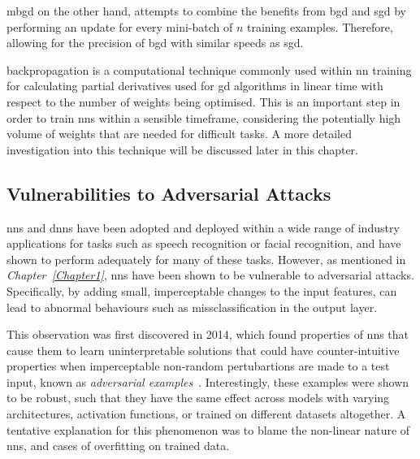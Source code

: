 \gls{mbgd} on the other hand, attempts to combine the benefits from \gls{bgd} and \gls{sgd} by 
performing an update for every mini-batch of $n$ training examples. Therefore, allowing for the precision of
\gls{bgd} with similar speeds as \gls{sgd}.

backpropagation is a computational technique commonly used within \gls{nn} training for calculating
partial derivatives used for \gls{gd} algorithms in linear time with respect 
to the number of weights being optimised. This is an important
step in order to train \glspl{nn} within a sensible timeframe, considering the potentially
high volume of weights that are needed for difficult tasks. A more detailed 
investigation into this technique will be discussed later in this chapter.

\subsection{Vulnerabilities to Adversarial Attacks}

\glspl{nn} and \glspl{dnn} have been adopted and deployed within a wide
range of industry applications for tasks such as speech recognition or facial recognition, 
and have shown to perform adequately for many of these tasks. However, as mentioned in \textit{Chapter~\ref{Chapter1}}, \glspl{nn} have been shown to be
vulnerable to adversarial attacks. Specifically, by adding small, imperceptable changes
to the input features, can lead to abnormal behaviours such as missclassification in the output layer.

This observation was first discovered in 2014,
which found properties of \glspl{nn} that cause them to learn uninterpretable solutions that could have counter-intuitive properties when
imperceptable non-random pertubartions are made to a test input, known as \textit{adversarial examples}~\citep{szegedy2014}. 
Interestingly, these examples were shown to be robust, such that they have the same effect
across models with varying architectures, activation functions, or trained on different datasets altogether. A tentative
explanation for this phenomenon was to blame the non-linear nature of \glspl{nn}, and cases of overfitting on trained data.

